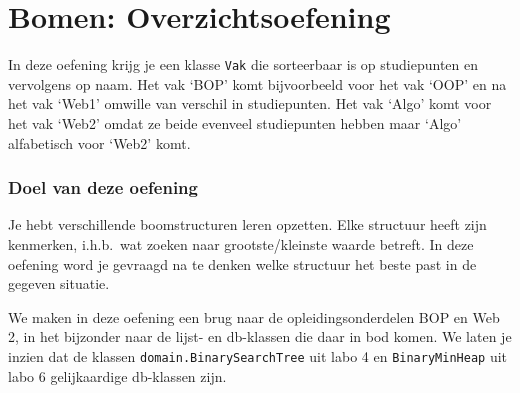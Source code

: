 \chapter{Bomen: Overzichtsoefening}

In deze oefening krijg je een klasse \verb/Vak/ die sorteerbaar is op studiepunten en vervolgens op naam. Het vak `BOP' komt bijvoorbeeld voor het vak `OOP' en na het vak `Web1' omwille van verschil  in studiepunten. Het vak `Algo' komt voor het vak `Web2' omdat ze beide evenveel studiepunten hebben maar `Algo' alfabetisch voor `Web2' komt.

\subsection*{Doel van deze oefening}
Je hebt verschillende boomstructuren leren opzetten. Elke structuur heeft zijn kenmerken, i.h.b.\ wat zoeken naar grootste/kleinste waarde betreft. In deze oefening word je gevraagd na te denken welke structuur het beste past in de gegeven situatie.

We maken in deze oefening een brug naar de opleidingsonderdelen BOP en Web 2, in het bijzonder naar de  lijst- en db-klassen die daar in bod komen. We laten je inzien dat de klassen  \verb/domain.BinarySearchTree/ uit labo 4  en \verb/BinaryMinHeap/ uit labo 6 gelijkaardige db-klassen zijn.

\newpage
